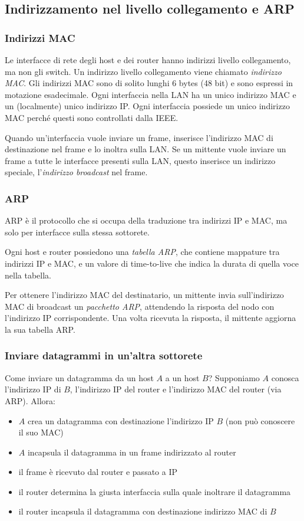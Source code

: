 \documentclass[11pt]{book}
\begin{document}
\subsection{Indirizzamento nel livello collegamento e ARP}
\subsubsection{Indirizzi MAC}
Le interfacce di rete degli host e dei router hanno indirizzi livello collegamento, ma non gli switch. Un indirizzo livello collegamento viene 
chiamato \textit{indirizzo MAC}. Gli indirizzi MAC sono di solito lunghi 6 bytes (48 bit) e sono espressi in motazione 
esadecimale. Ogni interfaccia nella LAN ha un unico indirizzo MAC e un (localmente) unico indirizzo IP. Ogni interfaccia 
possiede un unico indirizzo MAC perché questi sono controllati dalla IEEE. 

Quando un'interfaccia vuole inviare un frame, inserisce l'indirizzo MAC di destinazione nel frame e lo inoltra sulla LAN.
Se un mittente vuole inviare un frame a tutte le interfacce presenti sulla LAN, questo inserisce un indirizzo speciale,
l'\textit{indirizzo broadcast} nel frame.
\subsubsection{ARP}
ARP è il protocollo che si occupa della traduzione tra indirizzi IP e MAC, ma solo per interfacce sulla stessa sottorete.

Ogni host e router possiedono una \textit{tabella ARP}, che contiene mappature tra indirizzi IP e MAC, e un valore di 
time-to-live che indica la durata di quella voce nella tabella.  

Per ottenere l'indirizzo MAC del destinatario, un mittente invia sull'indirizzo MAC di broadcast un \textit{pacchetto ARP},
attendendo la risposta del nodo con l'indirizzo IP corrispondente. Una volta ricevuta la risposta, il mittente aggiorna 
la sua tabella ARP.
\subsubsection{Inviare datagrammi in un'altra sottorete}
Come inviare un datagramma da un host $A$ a un host $B$? Supponiamo $A$ conosca l'indirizzo IP di $B$, l'indirizzo IP del
router e l'indirizzo MAC del router (via ARP). Allora:
\begin{itemize}
    \item $A$ crea un datagramma con destinazione l'indirizzo IP $B$ (non può conoscere il suo MAC)
    \item $A$ incapsula il datagramma in un frame indirizzato al router
    \item il frame è ricevuto dal router e passato a IP
    \item il router determina la giusta interfaccia sulla quale inoltrare il datagramma 
    \item il router incapsula il datagramma con destinazione indirizzo MAC di $B$
\end{itemize}
\end{document}
